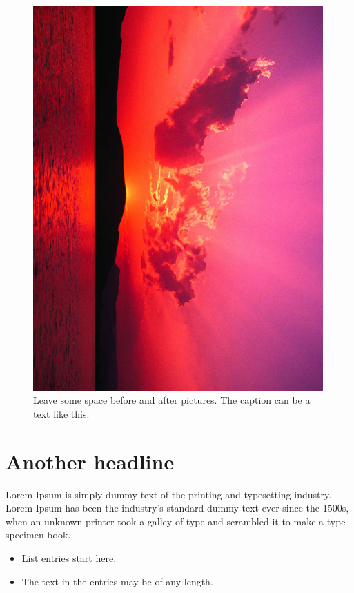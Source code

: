 \documentclass[final]{beamer}
\begin{document}
\begin{poster}
\begin{figure}
    \includegraphics[width=0.99\textwidth]{flames/pic1.png}
    \caption{\sffamily Leave some space before and after pictures. The caption can be a text like this.}
    \label{fig:pic1}
\end{figure}

\newcolumn

\section{Another headline}
\justifying
Lorem Ipsum is simply dummy text of the printing and typesetting industry. Lorem Ipsum has been the industry's standard dummy text ever since the 1500s, when an unknown printer took a galley of type and scrambled it to make a type specimen book. 

\begin{itemize}
  \item List entries start here.
  \item The text in the entries may be of any length.
\end{itemize}


\end{poster}
\end{document}
